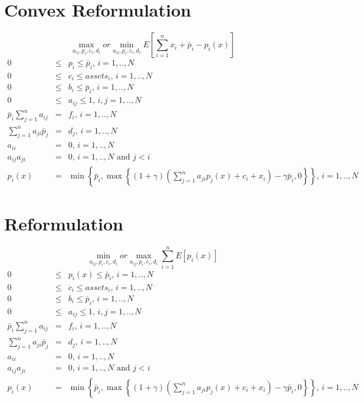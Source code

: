 \documentclass{article}
\begin{document}
\section{Convex Reformulation}

\[
\max_{a_{ij},p_{i},c_{i},d_{i}}or\min_{a_{ij},p_{i},c_{i},d_{i}}E\left[
\sum_{i=1}^{n}x_{i}+\bar{p}_{i}-p_{i}\left( x\right) \right] 
\]%
\begin{eqnarray*}
0 &\leq &p_{i}\leq \bar{p}_{i}\text{, }i=1,..,N \\
0 &\leq &c_{i}\leq assets_{i}\text{, }i=1,..,N \\
0 &\leq &b_{i}\leq \bar{p}_{i}\text{, }i=1,..,N \\
0 &\leq &a_{ij}\leq 1\text{, }i,j=1,..,N \\
\bar{p}_{i}\sum_{j=1}^{n}a_{ij} &=&f_{i}\text{, }i=1,..,N \\
\sum_{j=1}^{n}a_{ji}\bar{p}_{j} &=&d_{j}\text{, }i=1,..,N \\
a_{ii} &=&0\text{, }i=1,..,N \\
a_{ij}a_{ji} &=&0\text{, }i=1,..,N\text{ and }j<i \\
p_{i}\left( x\right)  &=&\min \left\{ \bar{p}_{i},\max \left\{ \left(
1+\gamma \right) \left( \sum_{j=1}^{n}a_{ji}p_{j}\left( x\right)
+c_{i}+x_{i}\right) -\gamma \bar{p}_{i},0\right\} \right\} \text{, }i=1,..,N
\end{eqnarray*}

\section{Reformulation}

\[
\min_{a_{ij},p_{i},c_{i},d_{i}}or\max_{a_{ij},p_{i},c_{i},d_{i}}%
\sum_{i=1}^{n}E\left[ p_{i}\left( x\right) \right] 
\]%
\begin{eqnarray*}
0 &\leq &p_{i}\left( x\right) \leq \bar{p}_{i}\text{, }i=1,..,N \\
0 &\leq &c_{i}\leq assets_{i}\text{, }i=1,..,N \\
0 &\leq &b_{i}\leq \bar{p}_{i}\text{, }i=1,..,N \\
0 &\leq &a_{ij}\leq 1\text{, }i,j=1,..,N \\
\bar{p}_{i}\sum_{j=1}^{n}a_{ij} &=&f_{i}\text{, }i=1,..,N \\
\sum_{j=1}^{n}a_{ji}\bar{p}_{j} &=&d_{j}\text{, }i=1,..,N \\
a_{ii} &=&0\text{, }i=1,..,N \\
a_{ij}a_{ji} &=&0\text{, }i=1,..,N\text{ and }j<i \\
p_{i}\left( x\right) &=&\min \left\{ \bar{p}_{i},\max \left\{ \left(
1+\gamma \right) \left( \sum_{j=1}^{n}a_{ji}p_{j}\left( x\right)
+c_{i}+x_{i}\right) -\gamma \bar{p}_{i},0\right\} \right\} \text{, }i=1,..,N
\end{eqnarray*}
\end{document}
